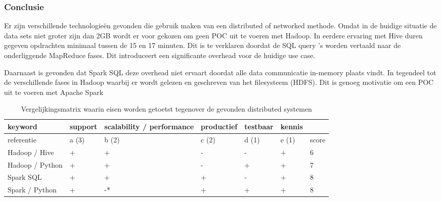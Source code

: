 \subsubsection{\textbf{Conclusie}}

Er zijn verschillende technologieën gevonden die gebruik maken van een distributed of networked methode. Omdat in de huidige situatie de data sets niet groter zijn dan 2GB wordt er voor gekozen om geen POC uit te voeren met Hadoop.  In eerdere ervaring met Hive duren gegeven opdrachten minimaal tussen de 15 en 17 minuten. Dit is te verklaren doordat de SQL query 's worden vertaald naar de onderliggende MapReduce fases. \parencite{thusoo2010hive} Dit introduceert een significante overhead voor de huidige use case.

Daarnaast is gevonden dat Spark SQL deze overhead niet ervaart doordat alle data communicatie in-memory plaats vindt. In tegendeel tot de verschillende fases in Hadoop waarbij er wordt gelezen en geschreven van het filesysteem (HDFS). Dit is genoeg motivatie om een POC uit te voeren met Apache Spark

\begin{table}[bh]
\caption{Vergelijkingsmatrix waarin eisen worden getoetst tegenover de gevonden distributed systemen}
\label{tab:matrix_distributed}
\begin{tabular}{|l|l|l|l|l|l|l|}
\hline
keyword         & support & scalability / performance & productief & testbaar & kennis &       \\ \hline
referentie      & a (3)   & b (2)                     & c (2)      & d (1)    & e (1)  & score \\ \hline
Hadoop / Hive   & +       & +                         & -          & -        & +      & 6     \\ \hline
Hadoop / Python & +       & +                         & -          & +        & +      & 7     \\ \hline
Spark SQL       & +       & +                         & +          & -        & +      & 8     \\ \hline
Spark / Python  & +       & -*                        & +          & +        & +      & 8     \\ \hline
\end{tabular}
\end{table}